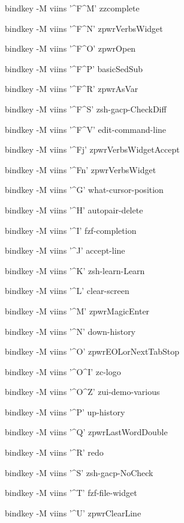 \documentclass[11pt,a4paper,twoside]{book}
\begin{document}
bindkey -M viins '\textasciicircum{}F\textasciicircum{}M' zzcomplete

bindkey -M viins '\textasciicircum{}F\textasciicircum{}N' zpwrVerbsWidget

bindkey -M viins '\textasciicircum{}F\textasciicircum{}O' zpwrOpen

bindkey -M viins '\textasciicircum{}F\textasciicircum{}P' basicSedSub

bindkey -M viins '\textasciicircum{}F\textasciicircum{}R' zpwrAsVar

bindkey -M viins '\textasciicircum{}F\textasciicircum{}S' zsh-gacp-CheckDiff

bindkey -M viins '\textasciicircum{}F\textasciicircum{}V' edit-command-line

bindkey -M viins '\textasciicircum{}Fj' zpwrVerbsWidgetAccept

bindkey -M viins '\textasciicircum{}Fn' zpwrVerbsWidget

bindkey -M viins '\textasciicircum{}G' what-cursor-position

bindkey -M viins '\textasciicircum{}H' autopair-delete

bindkey -M viins '\textasciicircum{}I' fzf-completion

bindkey -M viins '\textasciicircum{}J' accept-line

bindkey -M viins '\textasciicircum{}K' zsh-learn-Learn

bindkey -M viins '\textasciicircum{}L' clear-screen

bindkey -M viins '\textasciicircum{}M' zpwrMagicEnter

bindkey -M viins '\textasciicircum{}N' down-history

bindkey -M viins '\textasciicircum{}O' zpwrEOLorNextTabStop

bindkey -M viins '\textasciicircum{}O\textasciicircum{}I' zc-logo

bindkey -M viins '\textasciicircum{}O\textasciicircum{}Z' zui-demo-various

bindkey -M viins '\textasciicircum{}P' up-history

bindkey -M viins '\textasciicircum{}Q' zpwrLastWordDouble

bindkey -M viins '\textasciicircum{}R' redo

bindkey -M viins '\textasciicircum{}S' zsh-gacp-NoCheck

bindkey -M viins '\textasciicircum{}T' fzf-file-widget

bindkey -M viins '\textasciicircum{}U' zpwrClearLine
\end{document}
